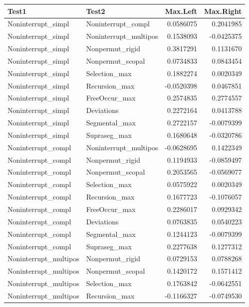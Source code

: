 \documentclass[
]{article}
\begin{document}
\begin{longtable}[]{@{}llrr@{}}
\toprule\noalign{}
Test1 & Test2 & Max.Left & Max.Right \\
\midrule\noalign{}
\endhead
\bottomrule\noalign{}
\endlastfoot
Noninterrupt\_simpl & Noninterrupt\_compl & 0.0586075 & 0.2041985 \\
Noninterrupt\_simpl & Noninterrupt\_multipos & 0.1538093 & -0.0425375 \\
Noninterrupt\_simpl & Nonpermut\_rigid & 0.3817291 & 0.1131670 \\
Noninterrupt\_simpl & Nonpermut\_scopal & 0.0734833 & 0.0843454 \\
Noninterrupt\_simpl & Selection\_max & 0.1882274 & 0.0020349 \\
Noninterrupt\_simpl & Recursion\_max & -0.0520398 & 0.0467851 \\
Noninterrupt\_simpl & FreeOccur\_max & 0.2574835 & 0.2774557 \\
Noninterrupt\_simpl & Deviations & 0.2272164 & 0.0413788 \\
Noninterrupt\_simpl & Segmental\_max & 0.2722157 & -0.0079399 \\
Noninterrupt\_simpl & Supraseg\_max & 0.1680648 & -0.0320786 \\
Noninterrupt\_compl & Noninterrupt\_multipos & -0.0628695 & 0.1422349 \\
Noninterrupt\_compl & Nonpermut\_rigid & 0.1194933 & -0.0859497 \\
Noninterrupt\_compl & Nonpermut\_scopal & 0.2053565 & -0.0569077 \\
Noninterrupt\_compl & Selection\_max & 0.0575922 & 0.0020349 \\
Noninterrupt\_compl & Recursion\_max & 0.1677723 & -0.1076057 \\
Noninterrupt\_compl & FreeOccur\_max & 0.2286017 & 0.0929342 \\
Noninterrupt\_compl & Deviations & 0.0763835 & 0.0540223 \\
Noninterrupt\_compl & Segmental\_max & 0.1244123 & -0.0079399 \\
Noninterrupt\_compl & Supraseg\_max & 0.2277638 & 0.1277312 \\
Noninterrupt\_multipos & Nonpermut\_rigid & 0.0729153 & 0.0788268 \\
Noninterrupt\_multipos & Nonpermut\_scopal & 0.1420172 & 0.1571412 \\
Noninterrupt\_multipos & Selection\_max & 0.1763842 & -0.0642551 \\
Noninterrupt\_multipos & Recursion\_max & -0.1166327 & -0.0749530 \\

\end{longtable}
\end{document}
